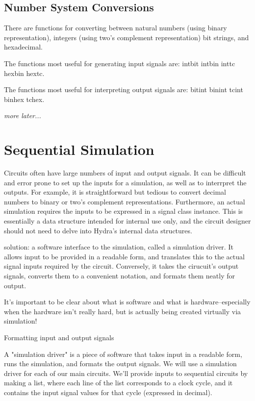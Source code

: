\documentclass[a4paper,openany,fleqn]{book}
\begin{document}
\subsection{Number System Conversions}
\label{sec:number-sys-conversion}

There are functions for converting between natural numbers (using
binary representation), integers (using two's complement
representation) bit strings, and hexadecimal.

The functions most useful for generating input signals are: intbit
intbin inttc hexbin hextc.

The functions most useful for interpreting output signals are: bitint
binint tcint binhex tchex.

\textit{more later...}

\section{Sequential Simulation}
\label{sec:sequential-simulation}

Circuits often have large numbers of input and output signals. It can
be difficult and error prone to set up the inputs for a simulation, as
well as to interrpret the outputs.  For example, it is straightforward
but tedious to convert decimal numbers to binary or two's complement
representations.  Furthermore, an actual simulation requires the
inputs to be expressed in a signal class instance.  This is
essentially a data structure intended for internal use only, and the
circuit designer should not need to delve into Hydra's internal data
structures.

solution: a software interface to the simulation, called a simulation
driver. It allows input to be provided in a readable form, and
translates this to the actual signal inputs required by the
circuit. Conversely, it takes the cirucuit's output signals, converts
them to a convenient notation, and formats them neatly for output.

It's important to be clear about what is software and what is
hardware--especially when the hardware isn't really hard, but is
actually being created virtually via simulation!

Formatting input and output signals

A "simulation driver" is a piece of software that takes input in a
readable form, runs the simulation, and formats the output signals.
We will use a simulation driver for each of our main circuits. 
We'll provide inputs to sequential circuits by making a list, where
each line of the list corresponds to a clock cycle, and it contains
the input signal values for that cycle (expressed in decimal).
\end{document}
